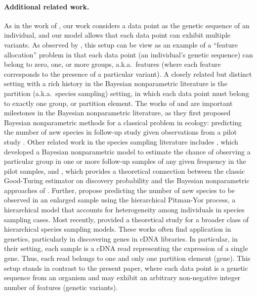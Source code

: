 \paragraph{Additional related work.}
As in the work of \citet{Camerlenghi2021, Masoero2022, chakraborty2019using, zou2016quantifying,gravel2014predicting,ionita2009estimating}, our work considers a data point as the genetic sequence of an individual, and our model allows that each data point can exhibit multiple variants. As observed by \citet{Masoero2022}, this setup can be view as an example of a ``feature allocation'' problem \citep{ghahramani2005infinite,Broderick2013} in that each data point (an individual's genetic sequence) can belong to zero, one, or more groups, a.k.a.\ features (where each feature corresponds to the presence of a particular variant). 
A closely related but distinct setting with a rich history in the Bayesian nonparametric literature is the partition (a.k.a.\ species sampling) setting, in which each data point must belong to exactly one group, or partition element. The works of \citet{lijoi2007bayesian} and \citet{favaro2009bayesian} are important milestones in the Bayesian nonparametric literature, as they first proposed Bayesian nonparametric methods for a classical problem in ecology: predicting the number of new species in follow-up study given observations from a pilot study \citep{efron1976estimating}.
Other related work in the species sampling literature includes \citet{favaro2012new}, which developed a Bayesian nonparametric model to estimate the chance of observing a particular group in one or more follow-up samples of any given frequency in the pilot samples, and \citet{favaro2016rediscovery}, which provides a theoretical connection between the classic Good-Turing estimator \citep{good1953population} on discovery probability and the Bayesian nonparametric approaches of \citet{lijoi2007bayesian, favaro2009bayesian, favaro2012new}. 
Further, \citet{camerlenghi2017bayesian} propose predicting the number of new species to be observed in an enlarged sample using the hierarchical Pitman-Yor process, a hierarchical model that accounts for heterogeneity among individuals in species sampling cases. 
Most recently, \citet{camerlenghi2019distribution} provided a theoretical study for a broader class of hierarchical species sampling models. 
These works often find application in genetics, particularly in discovering genes in cDNA libraries.
In particular, in their setting, each sample is a cDNA read representing the expression of a single gene.
Thus, each read belongs to one and only one partition element (gene). 
This setup stands in contrast to the present paper, where each data point is a genetic sequence from an organism
and may exhibit an arbitrary non-negative integer number of features (genetic variants).

